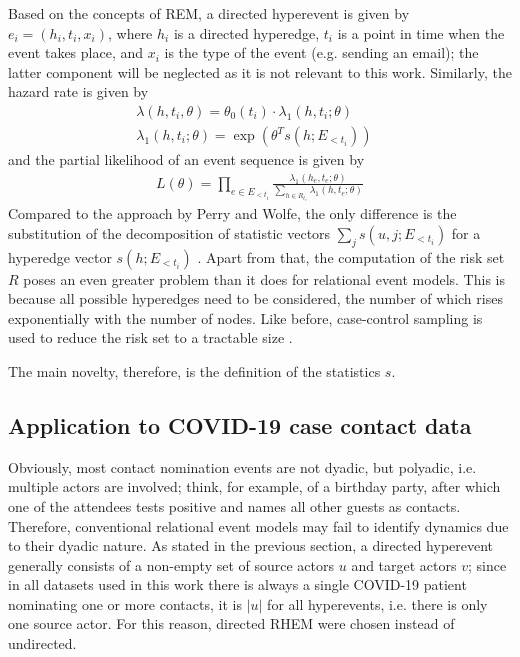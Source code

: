 Based on the concepts of REM, a directed hyperevent is given by $e_i = (h_i, t_i, x_i)$, where $h_i$ is a directed hyperedge, $t_i$ is a point in time when the event takes place, and $x_i$ is the type of the event (e.g. sending an email); the latter component will be neglected as it is not relevant to this work. Similarly, the hazard rate is given by
\begin{align*}
	&\lambda(h,t_i,\theta) = \theta_0(t_i) \cdot \lambda_1(h,t_i;\theta)&&\\
	&\lambda_1(h,t_i;\theta) = \exp(\theta^T s(h;E_{<t_i}))
\end{align*}
and the partial likelihood of an event sequence is given by 
\begin{align*}
	L(\theta) = \prod_{e \in E_{<t_i}} \frac{\lambda_1(h_e,t_e;\theta)}{\sum_{h\in R_{t_e}} \lambda_1(h,t_e;\theta)}
\end{align*}
Compared to the approach by Perry and Wolfe, the only difference is the substitution of the decomposition of statistic vectors $\sum_{j} s(u,j;E_{<t_i})$ for a hyperedge vector $s(h;E_{<t_i})$ \cite{lerner2019rem,lerner2021relational}. Apart from that, the computation of the risk set $R$ poses an even greater problem than it does for relational event models. This is because all possible hyperedges need to be considered, the number of which rises exponentially with the number of nodes. Like before, case-control sampling is used to reduce the risk set to a tractable size \cite{lerner2019rem,lerner2021relational}.
\bigskip

\noindent The main novelty, therefore, is the definition of the statistics $s$.

\subsection{Application to COVID-19 case contact data}
\label{sec:rhem_application}

Obviously, most contact nomination events are not dyadic, but polyadic, i.e. multiple actors are involved; think, for example, of a birthday party, after which one of the attendees tests positive and names all other guests as contacts. Therefore, conventional relational event models may fail to identify dynamics due to their dyadic nature. As stated in the previous section, a directed hyperevent generally consists of a non-empty set of source actors $u$ and target actors $v$; since in all datasets used in this work there is always a single COVID-19 patient nominating one or more contacts, it is $\lvert u \rvert$ for all hyperevents, i.e. there is only one source actor. For this reason, directed RHEM were chosen instead of undirected.

